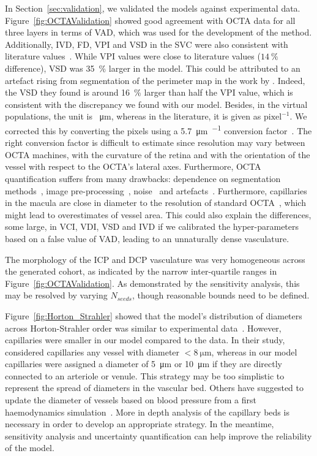 \documentclass[11pt,]{article}
\begin{document}
In Section~\ref{sec:validation}, we validated the models against experimental data.
Figure~\ref{fig:OCTAValidation} showed good agreement with OCTA data for all three layers in terms of VAD, which was used for the development of the method.
Additionally, IVD, FD, VPI and VSD in the SVC were also consistent with literature values~\cite{Chu2016,Ma2021,Liu_2021}.
While VPI values were close to literature values ($\SI{14}{\percent}$ difference), VSD was \SI{35}{\percent} larger in the model.
This could be attributed to an artefact rising from segmentation of the perimeter map in the work by \citet{Chu2016}.
Indeed, the VSD they found is around \SI{16}{\percent} larger than half the VPI value, which is consistent with the discrepancy we found with our model.
Besides, in the virtual populations, the unit is \SI{}{\micro\metre}, whereas in the literature, it is given as $\text{pixel}^{-1}$.
We corrected this by converting the pixels using a \SI{5.7}{\micro\metre\per{}} conversion factor~\cite{Spectralis}.
The right conversion factor is difficult to estimate since resolution may vary between OCTA machines, with the curvature of the retina and with the orientation of the vessel with respect to the OCTA's lateral axes. Furthermore, OCTA quantification suffers from many drawbacks: dependence on segmentation methods~\cite{Mehta_2020}, image pre-processing~\cite{Mehta_2019}, noise~\cite{Szpernal2023} and artefacts~\cite{Yao_2020}.
Furthermore, capillaries in the macula are close in diameter to the resolution of standard OCTA~\cite{Chu2016}, which might lead to overestimates of vessel area.
This could also explain the differences, some large, in VCI, VDI, VSD and IVD if we calibrated the hyper-parameters based on a false value of VAD, leading to an unnaturally dense vasculature.

The morphology of the ICP and DCP vasculature was very homogeneous across the generated cohort, as indicated by the narrow inter-quartile ranges in Figure~\ref{fig:OCTAValidation}.
As demonstrated by the sensitivity analysis, this may be resolved by varying $N_{seeds}$, though reasonable bounds need to be defined.

Figure~\ref{fig:Horton_Strahler} showed that the model's distribution of diameters across Horton-Strahler order was similar to experimental data~\cite{An2020}.
However, capillaries were smaller in our model compared to the data.
In their study, \citet{An2020} considered capillaries any vessel with diameter $<\SI{8}{\micro\metre}$, whereas in our model capillaries were assigned a diameter of \SI{5}{\micro\metre} or \SI{10}{\micro\metre} if they are directly connected to an arteriole or venule.
This strategy may be too simplistic to represent the spread of diameters in the vascular bed.
Others have suggested to update the diameter of vessels based on blood pressure from a first haemodynamics simulation~\cite{Linninger2013}.
More in depth analysis of the capillary beds is necessary in order to develop an appropriate strategy.
In the meantime, sensitivity analysis and uncertainty quantification can help improve the reliability of the model.
\end{document}
